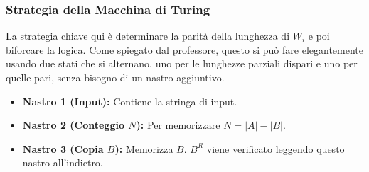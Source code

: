 \documentclass[a4paper]{article}
\theoremstyle{definition} %
\begin{document}
\subsubsection{Strategia della Macchina di Turing}
La strategia chiave qui è determinare la parità della lunghezza di $W_i$ e poi biforcare la logica. Come spiegato dal professore, questo si può fare elegantemente usando due stati che si alternano, uno per le lunghezze parziali dispari e uno per quelle pari, senza bisogno di un nastro aggiuntivo.
\begin{itemize}
    \item \textbf{Nastro 1 (Input):} Contiene la stringa di input.
    \item \textbf{Nastro 2 (Conteggio $N$):} Per memorizzare $N = |A| - |B|$.
    \item \textbf{Nastro 3 (Copia $B$):} Memorizza $B$. $B^R$ viene verificato leggendo questo nastro all'indietro.
\end{itemize}
\end{document}
